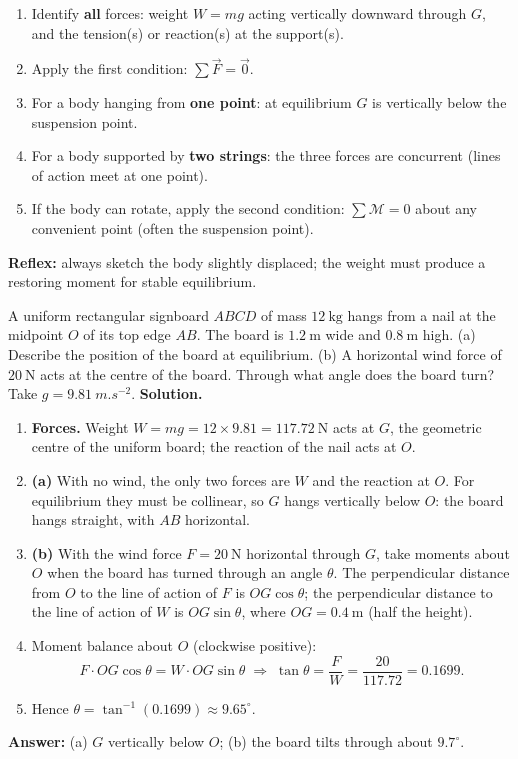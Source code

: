 \documentclass[11pt]{article}
\begin{document}
\begin{methode}
\begin{enumerate}
\item Identify \textbf{all} forces: weight $W=mg$ acting vertically downward through $G$, and the tension(s) or reaction(s) at the support(s).
\item Apply the first condition: $\sum \vec{F} = \vec{0}$.
\item For a body hanging from \textbf{one point}: at equilibrium $G$ is vertically below the suspension point.
\item For a body supported by \textbf{two strings}: the three forces are concurrent (lines of action meet at one point).
\item If the body can rotate, apply the second condition: $\sum \mathcal{M} = 0$ about any convenient point (often the suspension point).
\end{enumerate}
\textbf{Reflex:} always sketch the body slightly displaced; the weight must produce a restoring moment for stable equilibrium.
\end{methode}

\begin{exoresolu}
A uniform rectangular signboard $ABCD$ of mass $12\ \mathrm{kg}$ hangs from a nail at the midpoint $O$ of its top edge $AB$. The board is $1.2\ \mathrm{m}$ wide and $0.8\ \mathrm{m}$ high. (a) Describe the position of the board at equilibrium. (b) A horizontal wind force of $20\ \mathrm{N}$ acts at the centre of the board. Through what angle does the board turn? Take $g=\SI{9.81}{m.s^{-2}}$.
\tcblower
\textbf{Solution.}
\begin{enumerate}
\item \textbf{Forces.} Weight $W=mg=12\times 9.81=117.72\ \mathrm{N}$ acts at $G$, the geometric centre of the uniform board; the reaction of the nail acts at $O$.
\item \textbf{(a)} With no wind, the only two forces are $W$ and the reaction at $O$. For equilibrium they must be collinear, so $G$ hangs vertically below $O$: the board hangs straight, with $AB$ horizontal.
\item \textbf{(b)} With the wind force $F=20\ \mathrm{N}$ horizontal through $G$, take moments about $O$ when the board has turned through an angle $\theta$. The perpendicular distance from $O$ to the line of action of $F$ is $OG\cos\theta$; the perpendicular distance to the line of action of $W$ is $OG\sin\theta$, where $OG=0.4\ \mathrm{m}$ (half the height).
\item Moment balance about $O$ (clockwise positive):
\[ F\cdot OG\cos\theta = W\cdot OG\sin\theta \;\Longrightarrow\; \tan\theta=\frac{F}{W}=\frac{20}{117.72}=0.1699. \]
\item Hence $\theta=\tan^{-1}(0.1699)\approx 9.65^{\circ}$.
\end{enumerate}
\textbf{Answer:} (a) $G$ vertically below $O$; (b) the board tilts through about $9.7^{\circ}$.
\end{exoresolu}
\end{document}
